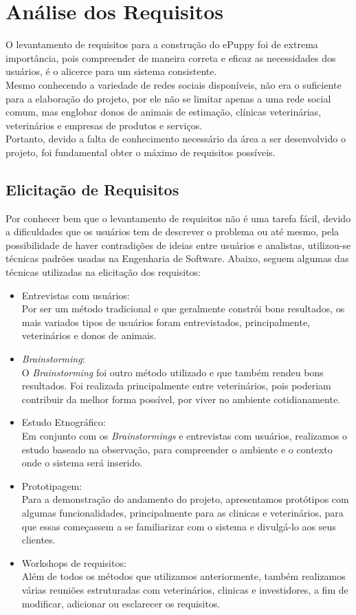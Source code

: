 \chapter{Análise dos Requisitos}
O levantamento de requisitos para a construção do ePuppy foi de extrema importância, pois compreender de maneira correta e eficaz as necessidades dos usuários, é o alicerce para um sistema consistente. 
\\
\indent
Mesmo conhecendo a variedade de redes sociais disponíveis, não era o suficiente para a elaboração do projeto, por ele não se limitar apenas a uma rede social comum, mas englobar donos de animais de estimação, clínicas veterinárias, veterinários e empresas de produtos e serviços.
\\
\indent
Portanto, devido a falta de conhecimento necessário da área a ser desenvolvido o projeto, foi fundamental obter o máximo de requisitos possíveis.

\section{Elicitação de Requisitos}
Por conhecer bem que o levantamento de requisitos não é uma tarefa fácil, devido a dificuldades que os usuários tem de descrever o problema ou até mesmo, pela possibilidade de haver contradições de ideias entre usuários e analistas, utilizou-se técnicas padrões usadas na Engenharia de Software. Abaixo, seguem algumas das técnicas utilizadas na elicitação dos requisitos:
\begin{itemize}
   \item Entrevistas com usuários:
   \\
   \indent
   Por ser um método tradicional e que geralmente constrói bons resultados, os mais variados tipos de usuários foram entrevistados, principalmente, veterinários e donos de animais. 
   \item {\it Brainstorming}:
    \\
   \indent
   O {\it Brainstorming} foi outro método utilizado e que também rendeu bons resultados. Foi realizada principalmente entre veterinários, pois poderiam contribuir da melhor forma possível, por viver no ambiente cotidianamente. 
   \item Estudo Etnográfico:
   \\
   \indent
   Em conjunto com os {\it Brainstormings} e entrevistas com usuários, realizamos o estudo baseado na observação, para compreender o ambiente e o contexto onde o sistema será inserido.
   \item Prototipagem: 
   \\
   \indent
   Para a demonstração do andamento do projeto, apresentamos protótipos com algumas funcionalidades, principalmente para as clinicas e veterinários, para que essas começassem a se familiarizar com o sistema e divulgá-lo aos seus clientes.
   \item Workshops de requisitos:
   \\
   \indent
   Além de todos os métodos que utilizamos anteriormente, também realizamos várias reuniões estruturadas com veterinários, clinicas e investidores, a fim de modificar, adicionar ou esclarecer os requisitos.
 \end{itemize}
 

